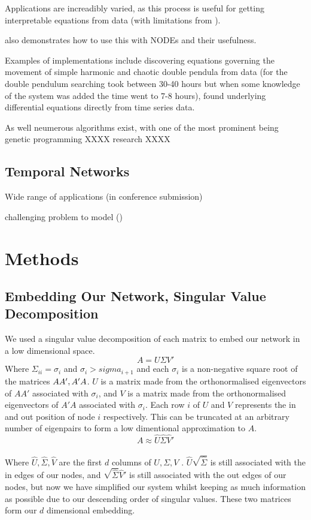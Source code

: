 \documentclass[12pt]{article}
\begin{document}
        Applications are increadibly varied, as this process is useful for getting interpretable equations from data (with limitations from \cite{kidger2022neural}).

        \cite{kidger2022neural} also demonstrates how to use this with NODEs and their usefulness.

        Examples of implementations include discovering equations governing the movement of simple harmonic and chaotic double pendula from data \cite{schmidt2009distilling}(for the double pendulum searching took between 30-40 hours but when some knowledge of the system was added the time went to 7-8 hours), found underlying differential equations directly from time series data\cite{bongard2007automated}.  

        As well neumerous algorithms exist, with one of the most prominent being genetic programming XXXX research XXXX

    \subsection{Temporal Networks}
        Wide range of applications (in conference submission)

        challenging problem to model ()


\section{Methods}
    
    \subsection{Embedding Our Network, Singular Value Decomposition}
    We used a singular value decomposition of each matrix to embed our network in a low dimensional space.\
    \[
    A = U\Sigma V'
    \]
    Where $\Sigma_{ii} = \sigma_i$ and $\sigma_i > sigma_{i+1}$ and each $\sigma_i$ is a non-negative square root of the matrices $AA', \space A'A$. $U$ is a matrix made from the orthonormalised eigenvectors of $AA'$ associated with $\sigma_i$, and $V$ is a matrix made from the orthonormalised eigenvectors of $A'A$ associated with $\sigma_i$. Each row $i$ of $U$ and $V$ represents the in and out position of node $i$ respectively. This can be truncated at an arbitrary number of eigenpairs to form a low dimentional approximation to $A$.
    \[
     A \approx \hat U \hat \Sigma \hat V'
    \]\\
    Where $\hat U, \hat \Sigma, \hat V$ are the first $d$ columns of $U, \Sigma, V$ \cite{golub1971singular}. $\hat U \sqrt{\hat \Sigma}$ is still associated with the in edges of our nodes, and $\sqrt{\hat \Sigma} \hat V' $ is still associated with the out edges of our nodes, but now we have simplified our system whilst keeping as much information as possible due to our descending order of singular values. These two matrices form our $d$ dimensional embedding.\\
\end{document}
